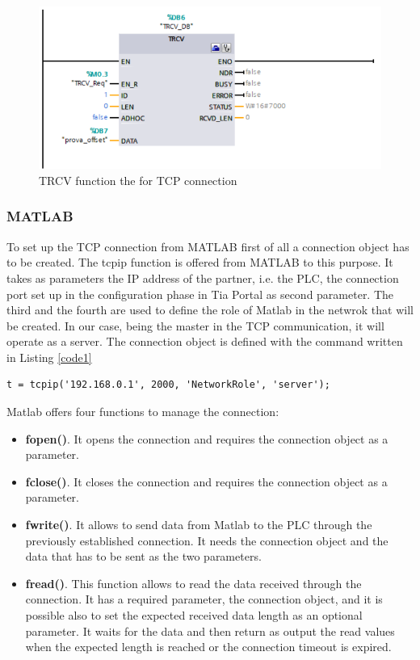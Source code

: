 \begin{itemize}
\begin{figure}[!h]
    \begin{center}
    \includegraphics[width=0.8\linewidth]{capitolo3/figure/trcv.PNG}
    \caption{TRCV function the for TCP connection}
    \label{fig:trcv}
    \end{center}
    \end{figure}
\end{itemize}

\subsubsection{MATLAB}
To set up the TCP connection from MATLAB first of all a connection object has to be created. The tcpip function is offered from MATLAB to this purpose. It takes as parameters the IP address of the partner, i.e. the PLC, the connection port set up in the configuration phase in Tia Portal as second parameter. The third and the fourth are used to define the role of Matlab in the netwrok that will be created. In our case, being the master in the TCP communication, it will operate as a server.
The connection object is defined with the command written in Listing \ref{code1}

\begin{lstlisting}[style=htmlcssjs,caption={Creation of the connection object},label=code1]
t = tcpip('192.168.0.1', 2000, 'NetworkRole', 'server');
\end{lstlisting}




Matlab offers four functions to manage the connection:
\begin{itemize}
    \item \textbf{fopen()}. It opens the connection and requires the connection object as a parameter.
    \item \textbf{fclose()}. It closes the connection and requires the connection object as a parameter.
    \item \textbf{fwrite()}. It allows to send data from Matlab to the PLC through the previously established connection. It needs the connection object and the data that has to be sent as the two parameters.
    \item \textbf{fread()}. This function allows to read the data received through the connection. It has a required parameter, the connection object, and it is possible also to set the expected received data length as an optional parameter. It waits for the data and then return as output the read values when the expected length is reached or the connection timeout is expired.
\end{itemize}


